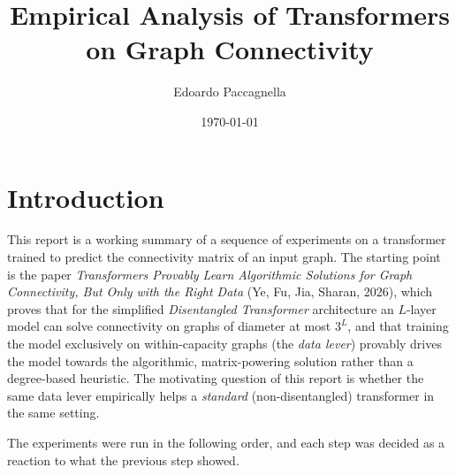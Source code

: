 \documentclass[11pt,a4paper]{article}
\title{Empirical Analysis of Transformers on Graph Connectivity}
\author{Edoardo Paccagnella}
\date{\today}
\begin{document}
\maketitle

\section{Introduction}
\label{sec:intro}

This report is a working summary of a sequence of experiments on a
transformer trained to predict the connectivity matrix of an input graph. The
starting point is the paper
\emph{Transformers Provably Learn Algorithmic Solutions for Graph
Connectivity, But Only with the Right Data} (Ye, Fu, Jia, Sharan, 2026), which
proves that for the simplified \emph{Disentangled Transformer} architecture an
$L$\nobreakdash-layer model can solve connectivity on graphs of diameter at
most $3^L$, and that training the model exclusively on within-capacity
graphs (the \emph{data lever}) provably drives the model towards the
algorithmic, matrix-powering solution rather than a degree-based heuristic.
The motivating question of this report is whether the same data lever
empirically helps a \emph{standard} (non-disentangled) transformer in the
same setting.

The experiments were run in the following order, and each step was decided as
a reaction to what the previous step showed.
\end{document}
